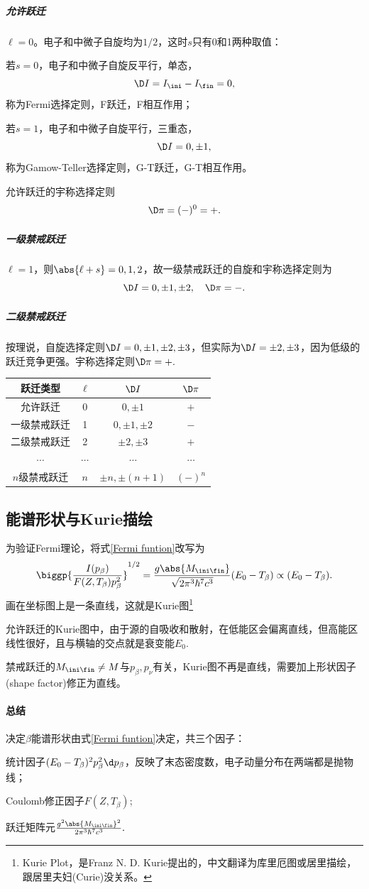 \subparagraph{允许跃迁}
$\ell=0$。电子和中微子自旋均为$1/2$，这时$s$只有0和1两种取值：
\begin{compactenum}
	\item 若$s=0$，电子和中微子自旋反平行，单态，
	\[
		\D I=I_\ini-I_\fin=0,
	\]
	称为Fermi选择定则，F跃迁，F相互作用；
	\item 若$s=1$，电子和中微子自旋平行，三重态，
	\[
		\D I=0,\pm 1,
	\]
	称为Gamow-Teller选择定则，G-T跃迁，G-T相互作用。
\end{compactenum}
允许跃迁的宇称选择定则
\[
	\D\pi=(-)^0=+.
\]
\subparagraph{一级禁戒跃迁}
$\ell=1$，则$\abs{\ell+s}=0,1,2$，故一级禁戒跃迁的自旋和宇称选择定则为
\[
	\D I=0,\pm 1,\pm 2,\quad\D\pi=-.
\]
\subparagraph{二级禁戒跃迁}
按理说，自旋选择定则$\D I=0,\pm 1,\pm 2,\pm 3$，但实际为$\D I=\pm 2,\pm 3$，因为低级的跃迁竞争更强。宇称选择定则$\D\pi=+.$
\begin{center}
	\begin{tabular}{cccc}
		\toprule
		跃迁类型&$\ell$&$\D I$&$\D\pi$\\
		\midrule
		允许跃迁&0&$0,\pm 1$&$+$\\
		一级禁戒跃迁&1&$0,\pm 1,\pm 2$&$-$\\
		二级禁戒跃迁&2&$\pm 2,\pm 3$&$+$\\
		$\cdots$&$\cdots$&$\cdots$&$\cdots$\\
		$n$级禁戒跃迁&$n$&$\pm n,\pm(n+1)$&$(-)^n$\\
		\bottomrule
	\end{tabular}
\end{center}

\subsection{\textbeta 能谱形状与Kurie描绘}

为验证Fermi理论，将式\eqref{Fermi funtion}改写为
\[
	\biggp{\frac{I(p_\beta)}{F(Z,T_\beta)p_\beta^2}}^{1/2}=\frac{g\abs{M_{\ini\fin}}}{\sqrt{2\pi^3\hbar^7c^3}}(E_0-T_\beta)\propto(E_0-T_\beta).
\]
画在坐标图上是一条直线，这就是Kurie图\footnote{Kurie Plot，是Franz N. D. Kurie提出的，中文翻译为库里厄图或居里描绘，跟居里夫妇(Curie)没关系。}

允许跃迁的Kurie图中，由于源的自吸收和散射，在低能区会偏离直线，但高能区线性很好，且与横轴的交点就是衰变能$E_0.$

禁戒跃迁的$M_{\ini\fin}\neq M$与$p_\beta,p_\nu$有关，Kurie图不再是直线，需要加上形状因子(shape factor)修正为直线。
\paragraph{总结}决定$\beta$能谱形状由式\eqref{Fermi funtion}决定，共三个因子：
\begin{compactenum}
	\item 统计因子$(E_0-T_\beta)^2p_\beta^2\d p_\beta$，反映了末态密度数，电子动量分布在两端都是抛物线；
	\item Coulomb修正因子$F(Z,T_\beta)$;
	\item 跃迁矩阵元$\frac{g^2\abs{M_{\ini\fin}}^2}{2\pi^3\hbar^7c^3}.$
\end{compactenum}

